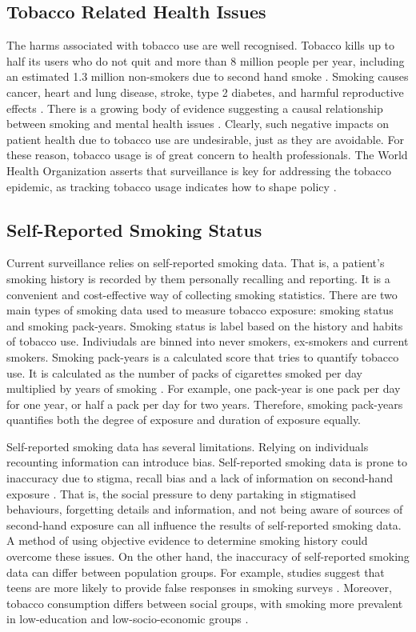 \documentclass{article}
\begin{document}
\subsection{Tobacco Related Health Issues}
The harms associated with tobacco use are well recognised. Tobacco kills up to half its users who do not quit and more than 8 million people per year, including an estimated 1.3 million non-smokers due to second hand smoke \cite{who_tobacco}. Smoking causes cancer, heart and lung disease, stroke, type 2 diabetes, and harmful reproductive effects \cite{hhs_smoking_2014}. There is a growing body of evidence suggesting a causal relationship between smoking and mental health issues \cite{taylor2019smoking}. Clearly, such negative impacts on patient health due to tobacco use are undesirable, just as they are avoidable. For these reason, tobacco usage is of great concern to health professionals. The World Health Organization asserts that surveillance is key for addressing the tobacco epidemic, as tracking tobacco usage indicates how to shape policy \cite{who_tobacco}.

\subsection{Self-Reported Smoking Status}
Current surveillance relies on self-reported smoking data. That is, a patient's smoking history is recorded by them personally recalling and reporting. It is a convenient and cost-effective way of collecting smoking statistics. There are two main types of smoking data used to measure tobacco exposure: smoking status and smoking pack-years. Smoking status is label based on the history and habits of tobacco use. Indiviudals are binned into never smokers, ex-smokers and current smokers. Smoking pack-years is a calculated score that tries to quantify tobacco use. It is calculated as the number of packs of cigarettes smoked per day multiplied by years of smoking \cite{smokingpackyears}. For example, one pack-year is one pack per day for one year, or half a pack per day for two years. Therefore, smoking pack-years quantifies both the degree of exposure and duration of exposure equally.

Self-reported smoking data has several limitations. Relying on individuals recounting information can introduce bias. Self-reported smoking data is prone to inaccuracy due to stigma, recall bias and a lack of information on second-hand exposure \cite{park2015correlation, gorber2009accuracy}. That is, the social pressure to deny partaking in stigmatised behaviours, forgetting details and information, and not being aware of sources of second-hand exposure can all influence the results of self-reported smoking data. A method of using objective evidence to determine smoking history could overcome these issues. On the other hand, the inaccuracy of self-reported smoking data can differ between population groups. For example, studies suggest that teens are more likely to provide false responses in smoking surveys \cite{park2015correlation}. Moreover, tobacco consumption differs between social groups, with smoking more prevalent in low-education and low-socio-economic groups \cite{cdc2019_smoking}.
\end{document}
